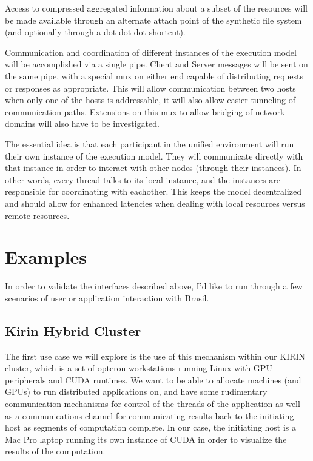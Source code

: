 \documentclass{sig-alternate}
\begin{document}
Access to compressed aggregated information about a subset of the
resources will be made available through an alternate attach point of the
synthetic file system (and optionally through a dot-dot-dot shortcut).

Communication and coordination of different instances of the execution
model will be accomplished via a single pipe.  Client and Server messages
will be sent on the same pipe, with a special mux on either end capable of
distributing requests or responses as appropriate.  This will allow
communication between two hosts when only one of the hosts is addressable,
it will also allow easier tunneling of communication paths.  Extensions on
this mux to allow bridging of network domains will also have to be investigated.

The essential idea is that each participant in the unified environment will
run their own instance of the execution model.  They will communicate directly
with that instance in order to interact with other nodes (through their
instances).  In other words, every thread talks to its local instance, and
the instances are responsible for coordinating with eachother.  This keeps
the model decentralized and should allow for enhanced latencies when dealing
with local resources versus remote resources.



\section{Examples}

In order to validate the interfaces described above, I'd like to run through
a few scenarios of user or application interaction with Brasil.

\subsection*{Kirin Hybrid Cluster}

The first use case we will explore is the use of this mechanism within our
KIRIN cluster, which is a set of opteron workstations running Linux  with 
GPU peripherals and CUDA runtimes.  We want to be able to allocate machines
(and GPUs) to run distributed applications on, and have some rudimentary
communication mechanisms for control of the threads of the application as well
as a communications channel for communicating results back to the initiating
host as segments of computation complete.  In our case, the initiating host
is a Mac Pro laptop running its own instance of CUDA in order to visualize
the results of the computation.
\end{document}

